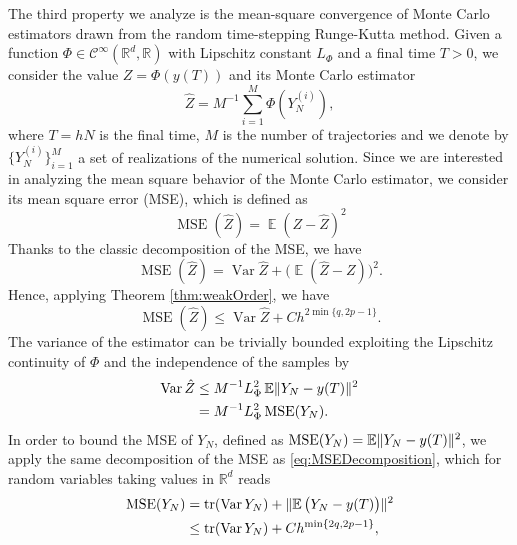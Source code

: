 \documentclass{siamart1116}
\numberwithin{theorem}{section}
\DeclarePairedDelimiter{\norm}{\|}{\|}
\newcommand{\R}{\mathbb{R}}
\newcommand{\Var}{\operatorname{Var}}
\newcommand{\E}{\operatorname{\mathbb{E}}}
\newcommand{\MSE}{\operatorname{MSE}}
\newcommand{\trace}{\operatorname{tr}}
\newcommand{\sksum}{{\textstyle\sum}}
\newcommand{\corr}[1]{{\color{bordeaux}#1}}
\begin{document}
The third property we analyze is the mean-square convergence of Monte Carlo estimators drawn from the random time-stepping Runge-Kutta method. Given a function $\Phi\in\mathcal{C}^\infty(\R^d, \R)$ with Lipschitz constant $L_\Phi$ and a final time $T > 0$, we consider the value $Z = \Phi(y(T))$ and its Monte Carlo estimator 
\begin{equation}\label{eq:MSE}
	\hat Z = M^{-1} \sksum_{i = 1}^M \Phi(Y_N^{(i)}),
\end{equation}
where $T = hN$ is the final time, $M$ is the number of trajectories and we denote by $\{Y_N^{(i)}\}_{i=1}^M$ a set of realizations of the numerical solution. \corr{Since we are interested in analyzing the mean square behavior of the Monte Carlo estimator, we consider its mean square error (MSE), which is defined as
\begin{equation}
	\MSE(\hat Z) = \E(Z - \hat Z)^2
\end{equation}}
Thanks to the classic decomposition of the MSE, we have
\begin{equation}\label{eq:MSEDecomposition}
	\MSE(\hat Z) = \Var \hat Z  + \big(\E(\hat Z - Z)\big)^2.
\end{equation}
Hence, applying Theorem \ref{thm:weakOrder}, we have
\begin{equation}\label{eq:MSEWeakOrder}
	\MSE(\hat Z) \leq \Var \hat Z  + Ch^{2\min\{q, 2p - 1\}}.
\end{equation}
The variance of the estimator can be trivially bounded exploiting the Lipschitz continuity of $\Phi$ and the independence of the samples by
\begin{equation}\label{eq:MSELipschitz}
\begin{aligned}
	\Var\hat Z &\leq M^{-1} L_\Phi^2 \E \norm{Y_N - y(T)}^2 \\
    &= M^{-1} L_\Phi^2 \MSE(Y_N).
\end{aligned}
\end{equation}
In order to bound the MSE of $Y_N$, defined as $\MSE(Y_N) = \E\norm{Y_N - y(T)}^2$, we apply the same decomposition of the MSE as \eqref{eq:MSEDecomposition}, which for random variables taking values in $\R^d$ reads
\begin{equation}\label{eq:MSEStrongOrder}
\begin{aligned}
	\MSE(Y_N) &= \trace(\Var Y_N) + \norm{\E\big(Y_N - y(T)\big)}^2\\
    &\leq \trace(\Var Y_N) + Ch^{\min\{2q, 2p -1\}},
\end{aligned}
\end{equation}
\end{document}
